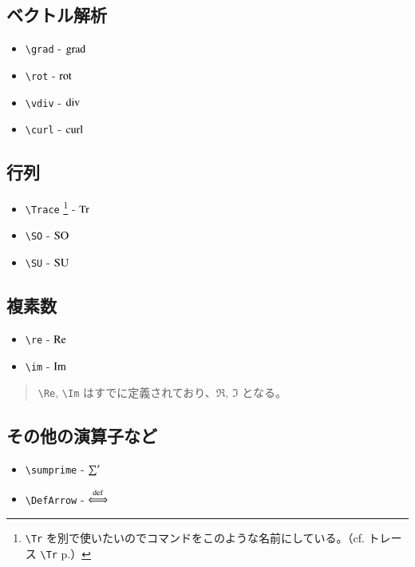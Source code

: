 \documentclass[oneside,10pt,a4paper]{jsarticle}
\begin{document}
  \subsection{ベクトル解析}

  \begin{itemize}
    \item \verb|\grad| - $ \operatorname{grad} $
    \item \verb|\rot| - $ \operatorname{rot} $
    \item \verb|\vdiv| - $ \operatorname{div} $
    \item \verb|\curl| - $ \operatorname{curl} $
  \end{itemize}

  \subsection{行列}

  \begin{itemize}
    \item \verb|\Trace| \footnote{\verb|\Tr| を別で使いたいのでコマンドをこのような名前にしている。（cf.  トレース \verb|\Tr| p.\pageref{Tr}）} - $ \operatorname{Tr} $
    \item \verb|\SO| - $ \operatorname{SO} $
    \item \verb|\SU| - $ \operatorname{SU} $
  \end{itemize}

  \newpage

  \subsection{複素数}

  \begin{itemize}
    \item \verb|\re| - $ \operatorname{Re} $
    \item \verb|\im| - $ \operatorname{Im} $
  \end{itemize}

  \Remark
  \begin{quote}
    \verb|\Re|, \verb|\Im| はすでに定義されており、$ \Re $, $ \Im $ となる。
  \end{quote}

  \subsection{その他の演算子など}

  \begin{itemize}
    \item \verb|\sumprime| - $ \operatorname*{{\sum}^{\prime}} $
    \item \verb|\DefArrow| - $ \operatorname{{\stackrel{\mathrm{def}}{\Longleftrightarrow}}} $
  \end{itemize}
\end{document}
